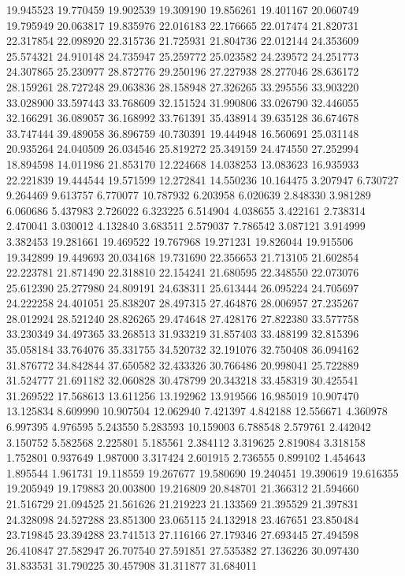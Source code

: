 19.945523
19.770459
19.902539
19.309190
19.856261
19.401167
20.060749
19.795949
20.063817
19.835976
22.016183
22.176665
22.017474
21.820731
22.317854
22.098920
22.315736
21.725931
21.804736
22.012144
24.353609
25.574321
24.910148
24.735947
25.259772
25.023582
24.239572
24.251773
24.307865
25.230977
28.872776
29.250196
27.227938
28.277046
28.636172
28.159261
28.727248
29.063836
28.158948
27.326265
33.295556
33.903220
33.028900
33.597443
33.768609
32.151524
31.990806
33.026790
32.446055
32.166291
36.089057
36.168992
33.761391
35.438914
39.635128
36.674678
33.747444
39.489058
36.896759
40.730391
19.444948
16.560691
25.031148
20.935264
24.040509
26.034546
25.819272
25.349159
24.474550
27.252994
18.894598
14.011986
21.853170
12.224668
14.038253
13.083623
16.935933
22.221839
19.444544
19.571599
12.272841
14.550236
10.164475
3.207947
6.730727
9.264469
9.613757
6.770077
10.787932
6.203958
6.020639
2.848330
3.981289
6.060686
5.437983
2.726022
6.323225
6.514904
4.038655
3.422161
2.738314
2.470041
3.030012
4.132840
3.683511
2.579037
7.786542
3.087121
3.914999
3.382453
19.281661
19.469522
19.767968
19.271231
19.826044
19.915506
19.342899
19.449693
20.034168
19.731690
22.356653
21.713105
21.602854
22.223781
21.871490
22.318810
22.154241
21.680595
22.348550
22.073076
25.612390
25.277980
24.809191
24.638311
25.613444
26.095224
24.705697
24.222258
24.401051
25.838207
28.497315
27.464876
28.006957
27.235267
28.012924
28.521240
28.826265
29.474648
27.428176
27.822380
33.577758
33.230349
34.497365
33.268513
31.933219
31.857403
33.488199
32.815396
35.058184
33.764076
35.331755
34.520732
32.191076
32.750408
36.094162
31.876772
34.842844
37.650582
32.433326
30.766486
20.998041
25.722889
31.524777
21.691182
32.060828
30.478799
20.343218
33.458319
30.425541
31.269522
17.568613
13.611256
13.192962
13.919566
16.985019
10.907470
13.125834
8.609990
10.907504
12.062940
7.421397
4.842188
12.556671
4.360978
6.997395
4.976595
5.243550
5.283593
10.159003
6.788548
2.579761
2.442042
3.150752
5.582568
2.225801
5.185561
2.384112
3.319625
2.819084
3.318158
1.752801
0.937649
1.987000
3.317424
2.601915
2.736555
0.899102
1.454643
1.895544
1.961731
19.118559
19.267677
19.580690
19.240451
19.390619
19.616355
19.205949
19.179883
20.003800
19.216809
20.848701
21.366312
21.594660
21.516729
21.094525
21.561626
21.219223
21.133569
21.395529
21.397831
24.328098
24.527288
23.851300
23.065115
24.132918
23.467651
23.850484
23.719845
23.394288
23.741513
27.116166
27.179346
27.693445
27.494598
26.410847
27.582947
26.707540
27.591851
27.535382
27.136226
30.097430
31.833531
31.790225
30.457908
31.311877
31.684011
